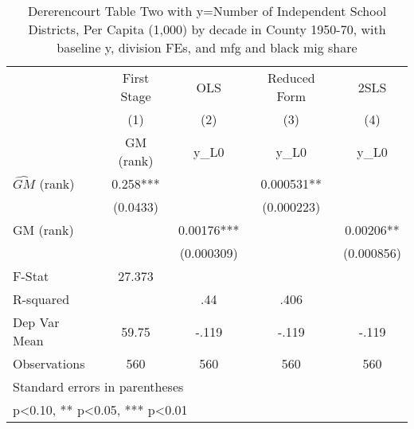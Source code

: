 \begin{table}[htbp]\centering
\def\sym#1{\ifmmode^{#1}\else\(^{#1}\)\fi}
\caption{Dererencourt Table Two with y=Number of Independent School Districts, Per Capita (1,000) by decade in County 1950-70, with baseline y, division FEs, and mfg and black mig share}
\begin{tabular}{l*{4}{c}}
\toprule
                    & First Stage   &         OLS   &Reduced Form   &        2SLS   \\
                    &\multicolumn{1}{c}{(1)}&\multicolumn{1}{c}{(2)}&\multicolumn{1}{c}{(3)}&\multicolumn{1}{c}{(4)}\\
                    &\multicolumn{1}{c}{GM  (rank)}&\multicolumn{1}{c}{y\_L0}&\multicolumn{1}{c}{y\_L0}&\multicolumn{1}{c}{y\_L0}\\
\midrule
$\hat{GM}$ (rank)   &       0.258***&               &    0.000531** &               \\
                    &    (0.0433)   &               &  (0.000223)   &               \\
\addlinespace
GM  (rank)          &               &     0.00176***&               &     0.00206** \\
                    &               &  (0.000309)   &               &  (0.000856)   \\
\midrule
F-Stat              &      27.373   &               &               &               \\
R-squared           &               &         .44   &        .406   &               \\
Dep Var Mean        &       59.75   &       -.119   &       -.119   &       -.119   \\
Observations        &         560   &         560   &         560   &         560   \\
\bottomrule
\multicolumn{5}{l}{\footnotesize Standard errors in parentheses}\\
\multicolumn{5}{l}{\footnotesize * p<0.10, ** p<0.05, *** p<0.01}\\
\end{tabular}
\end{table}
